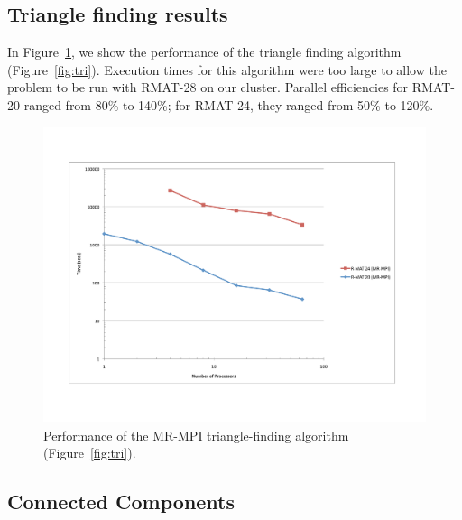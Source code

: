 \subsection{Triangle finding results}

In Figure~\ref{f:tri}, we show the performance of the triangle finding 
algorithm (Figure~\ref{fig:tri}).  Execution times for this algorithm were
too large to allow the problem to be run with RMAT-28 on our cluster.
Parallel efficiencies for RMAT-20 ranged from 80\% to 140\%; for RMAT-24, they
ranged from 50\% to 120\%.  

\begin{figure}[htb]
\includegraphics[width=\textwidth]{fig_tri.pdf}
\caption{Performance of the MR-MPI triangle-finding algorithm
(Figure~\ref{fig:tri}).}
\label{f:tri}
\end{figure}

\subsection{Connected Components}

